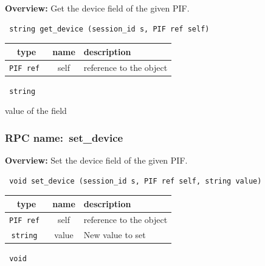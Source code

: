 {\bf Overview:} 
Get the device field of the given PIF.

\begin{verbatim} string get_device (session_id s, PIF ref self)\end{verbatim}



 
\vspace{0.3cm}
\begin{tabular}{|c|c|p{7cm}|}
 \hline
{\bf type} & {\bf name} & {\bf description} \\ \hline
{\tt PIF ref } & self & reference to the object \\ \hline 

\end{tabular}

\vspace{0.3cm}

{\tt 
string
}


value of the field
\vspace{0.3cm}
\vspace{0.3cm}
\vspace{0.3cm}
\subsubsection{RPC name:~set\_device}

{\bf Overview:} 
Set the device field of the given PIF.

\begin{verbatim} void set_device (session_id s, PIF ref self, string value)\end{verbatim}



 
\vspace{0.3cm}
\begin{tabular}{|c|c|p{7cm}|}
 \hline
{\bf type} & {\bf name} & {\bf description} \\ \hline
{\tt PIF ref } & self & reference to the object \\ \hline 

{\tt string } & value & New value to set \\ \hline 

\end{tabular}

\vspace{0.3cm}

{\tt 
void
}



